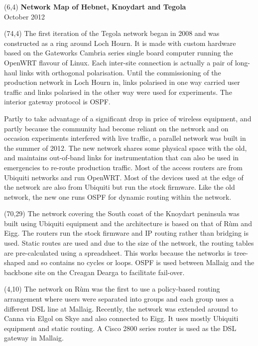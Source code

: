 \documentclass[noborder,onecolumn]{netmap}
\begin{document}
\begin{textblock}{32}(6,4)
  \textbf{\fontsize{60}{80}\selectfont
    Network Map of Hebnet, Knoydart and Tegola}\\
  {\Huge October 2012}
\end{textblock}
\begin{textblock}{10}(74,4)
  \linespread{1.0}
  \scriptsize
  The first iteration of the Tegola network began in 2008 and was
    constructed as a ring around Loch Hourn. It is made with custom
    hardware based on the Gateworks Cambria series single board computer
    running the OpenWRT flavour of Linux. Each inter-site connection is
    actually a pair of long-haul links with orthogonal polarisation. Until
    the commissioning of the production network in Loch Hourn in,
    links polarised in one way carried user traffic and 
    links polarised in the other way were used for experiments. The
    interior gateway protocol is OSPF.

    Partly to take advantage of a significant drop in price of
    wireless equipment, and partly because the community had become
    reliant on the network and on occasion experiments
    interfered with live traffic, a parallel network was built in the
    summer of 2012. The new network shares some physical space with the
    old, and maintains out-of-band links for instrumentation that can also
    be used in emergencies to re-route production traffic. Most of the
    access routers are from Ubiquiti networks and run OpenWRT. Most of the
    devices used at the edge of the network are also from Ubiquiti but run
    the stock firmware.  Like the old network, the new one runs OSPF for
    dynamic routing within the network.
\end{textblock}
\begin{textblock}{14}(70,29)
  \linespread{1.0}
  \scriptsize
  The network covering the South coast of the Knoydart peninsula was
  built using Ubiquiti equipment and the architecture is based on that
  of Rùm and Eigg. The routers run the stock firmware and IP routing
  rather than bridging is used. Static routes are used and due to the
  size of the network, the routing tables are pre-calculated using a
  spreadsheet. This works because the networks is tree-shaped and so
  contains no cycles or loops. OSPF is used between Mallaig and the
  backbone site on the Creagan Dearga to facilitate fail-over.
\end{textblock}
\begin{textblock}{12}(4,10)
  \linespread{1.0}
  \scriptsize
  The network on R\`um was the first to use a policy-based routing
  arrangement where users were separated into groups and each group uses
  a different DSL line at Mallaig. Recently, the network
  was extended around to Canna via Elgol on Skye and also connected to
  Eigg. It uses mostly Ubiquiti equipment and static routing. A Cisco
  2800 series router is used as the DSL gateway in Mallaig.
\end{textblock}
\end{document}
